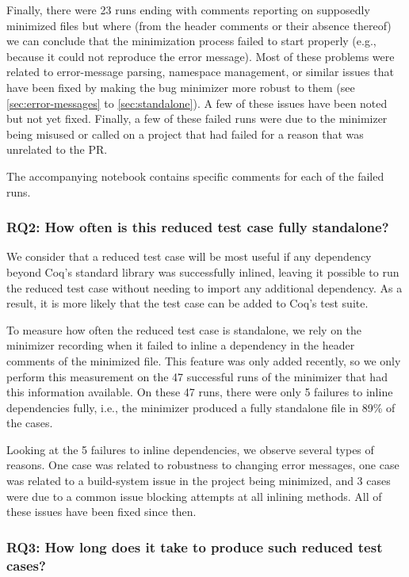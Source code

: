\documentclass[a4paper,USenglish,cleveref,autoref,thm-restate,pdfa]{lipics-v2021}
\begin{document}
Finally, there were 23 runs ending with comments reporting on supposedly minimized files but where (from the header comments or their absence thereof) we can conclude that the minimization process failed to start properly (e.g., because it could not reproduce the error message). Most of these problems were related to error-message parsing, namespace management, or similar issues that have been fixed by making the bug minimizer more robust to them (see \autoref{sec:error-messages} to \autoref{sec:standalone}). A few of these issues have been noted but not yet fixed. Finally, a few of these failed runs were due to the minimizer being misused or called on a project that had failed for a reason that was unrelated to the PR.

The accompanying notebook contains specific comments for each of the failed runs.

\subsubsection{RQ2: How often is this reduced test case fully standalone?}

We consider that a reduced test case will be most useful if any dependency beyond Coq's standard library was successfully inlined, leaving it possible to run the reduced test case without needing to import any additional dependency. As a result, it is more likely that the test case can be added to Coq's test suite.

To measure how often the reduced test case is standalone, we rely on the minimizer recording when it failed to inline a dependency in the header comments of the minimized file. This feature was only added recently, so we only perform this measurement on the 47 successful runs of the minimizer that had this information available.
On these 47 runs, there were only 5 failures to inline dependencies fully, i.e., the minimizer produced a fully standalone file in 89\% of the cases.

Looking at the 5 failures to inline dependencies, we observe several types of reasons. One case was related to robustness to changing error messages, one case was related to a build-system issue in the project being minimized, and 3 cases were due to a common issue blocking attempts at all inlining methods. All of these issues have been fixed since then.

\subsubsection{RQ3: How long does it take to produce such reduced test cases?}
\end{document}
